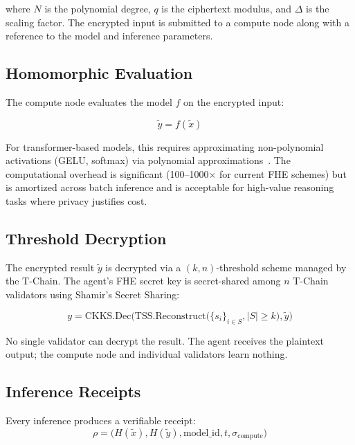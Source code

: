 \documentclass[11pt,a4paper]{article}
\begin{document}
where $N$ is the polynomial degree, $q$ is the ciphertext modulus, and $\Delta$ is the scaling factor. The encrypted input is submitted to a compute node along with a reference to the model and inference parameters.

\subsection{Homomorphic Evaluation}

The compute node evaluates the model $f$ on the encrypted input:

\begin{equation}\label{eq:he-eval}
    \tilde{y} = f(\tilde{x})
\end{equation}

For transformer-based models, this requires approximating non-polynomial activations (GELU, softmax) via polynomial approximations~\cite{lee2022privacy}. The computational overhead is significant (100--1000$\times$ for current FHE schemes) but is amortized across batch inference and is acceptable for high-value reasoning tasks where privacy justifies cost.

\subsection{Threshold Decryption}

The encrypted result $\tilde{y}$ is decrypted via a $(k, n)$-threshold scheme managed by the T-Chain. The agent's FHE secret key is secret-shared among $n$ T-Chain validators using Shamir's Secret Sharing:

\begin{equation}\label{eq:threshold-dec}
    y = \text{CKKS.Dec}\Big(\text{TSS.Reconstruct}\big(\{s_i\}_{i \in S}, |S| \geq k\big), \tilde{y}\Big)
\end{equation}

No single validator can decrypt the result. The agent receives the plaintext output; the compute node and individual validators learn nothing.

\subsection{Inference Receipts}

Every inference produces a verifiable receipt:
\begin{equation}\label{eq:receipt}
    \rho = \big(H(\tilde{x}), H(\tilde{y}), \text{model\_id}, t, \sigma_{\text{compute}}\big)
\end{equation}
\end{document}
